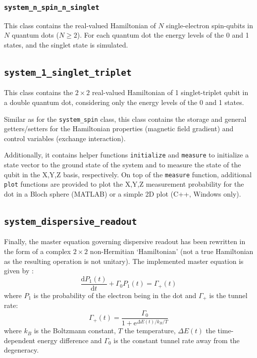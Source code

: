 \documentclass[10pt,a4paper,onecolumn,notitlepage]{article}
\begin{document}
\subsubsection{\lstinline{system_n_spin_n_singlet}}
This class contains the real-valued Hamiltonian of $N$ single-electron spin-qubits in $N$ quantum dots ($N \ge 2$). For each quantum dot the energy levels of the 0 and 1 states, and the singlet state is simulated.

\subsection{\lstinline{system_1_singlet_triplet}}
This class contains the $2\times2$ real-valued Hamiltonian of 1 singlet-triplet qubit in a double quantum dot, considering only the energy levels of the 0 and 1 states.

Similar as for the \lstinline{system_spin} class, this class contains the storage and general getters/setters for the Hamiltonian properties (magnetic field gradient) and control variables (exchange interaction).

Additionally, it contains helper functions \lstinline{initialize} and \lstinline{measure} to initialize a state vector to the ground state of the system and to measure the state of the qubit in the X,Y,Z basis, respectively. On top of the \lstinline{measure} function, additional \lstinline{plot} functions are provided to plot the X,Y,Z measurement probability for the dot in a Bloch sphere (MATLAB) or a simple 2D plot (C++, Windows only).

\subsection{\lstinline{system_dispersive_readout}}
Finally, the master equation governing dispersive readout has been rewritten in the form of a complex $2\times2$ non-Hermitian `Hamiltonian' (not a true Hamiltonian as the resulting operation is not unitary). The implemented master equation is given by \cite{gonzalez2015probing}:
\begin{equation}
\frac{\mathrm{d}P_1(t)}{\mathrm{d}t} + \Gamma_0 P_1(t) = \Gamma_+(t)
\end{equation}
where $P_1$ is the probability of the electron being in the dot and $\Gamma_+$ is the tunnel rate:
\begin{equation}
\Gamma_+(t) = \frac{\Gamma_0}{1 + \mathrm{e}^{\Delta E(t) / k_B / T}}
\end{equation}
where $k_B$ is the Boltzmann constant, $T$ the temperature, $\Delta E(t)$ the time-dependent energy difference and $\Gamma_0$ is the constant tunnel rate away from the degeneracy.
\end{document}
